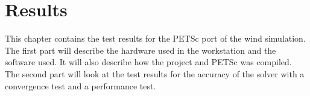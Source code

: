 \chapter{Results}

This chapter contains the test results for the PETSc port of the wind simulation. 
The first part will describe the hardware used in the workstation and the software 
used. It will also describe how the project and PETSc was compiled. The second part 
will look at the test results for the accuracy of the solver with a convergence 
test and a performance test. 




